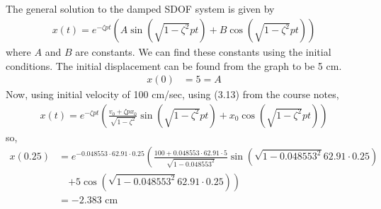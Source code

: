 \subsection{}
The general solution to the damped SDOF system is given by
\begin{align*}
    x(t) = e^{-\zeta p t}\left(A\sin\left(\sqrt{1-\zeta^2}pt\right) + B\cos\left(\sqrt{1-\zeta^2}pt\right)\right)
\end{align*}
where $A$ and $B$ are constants. We can find these constants using the initial conditions. The initial displacement can be found from the graph to be 5 cm.
\begin{align*}
    x(0) &= 5 = A 
\end{align*}
Now, using initial velocity of 100 cm/sec, using (3.13) from the course notes, 
\begin{align*}
    x(t) = e^{-\zeta p t}\left(\frac{v_0 + \zeta p x_0}{\sqrt{1-\zeta^2}}\sin\left(\sqrt{1-\zeta^2}pt\right) + x_0\cos\left(\sqrt{1-\zeta^2}pt\right)\right)
\end{align*}
so,
\begin{align*}
    x(0.25) &= e^{-0.048553 \cdot 62.91 \cdot 0.25}\left(\frac{100 + 0.048553 \cdot 62.91 \cdot 5}{\sqrt{1-0.048553^2}}\sin\left(\sqrt{1-0.048553^2}62.91\cdot 0.25\right) \right. \\
    &\quad \left. + 5\cos\left(\sqrt{1-0.048553^2}62.91\cdot 0.25\right)\right) \\
    &= \boxed{-2.383 \text{ cm}}
\end{align*}
